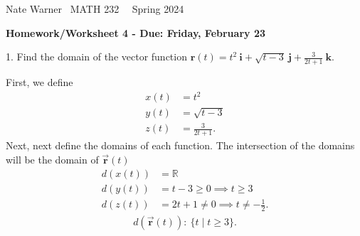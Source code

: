 \documentclass{report}
\title{\Huge{}}
\author{\huge{Nathan Warner}}
\date{\huge{}}
\begin{document}
    \pagebreak \bigbreak \noindent
    Nate Warner \ \quad \quad \quad \quad \quad \quad \quad \quad \quad \quad \quad \quad  MATH 232 \quad  \quad \quad \quad \quad \quad \quad \quad \quad \ \ \quad \quad Spring 2024
    \begin{center}
        \textbf{Homework/Worksheet 4 - Due: Friday, February 23}
    \end{center}
    \bigbreak \noindent 
    \begin{mdframed}
        1. Find the domain of the vector function $\mathbf{r}(t) = t^2\ \mathbf{i} + \sqrt{t - 3}\ \mathbf{j} + \frac{3}{2t+1}\ \mathbf{k}$.
    \end{mdframed}
    \bigbreak \noindent 
    First, we define
    \begin{align*}
        x(t) &= t^{2} \\
        y(t) &= \sqrt{t-3} \\
        z(t) &= \frac{3}{2t+1}
    .\end{align*}
    Next, next define the domains of each function. The intersection of the domains will be the domain of $\vec{\mathbf{r}}(t)$
    \begin{align*}
        d(x(t)) &=  \mathbb{R} \\
        d(y(t)) &= t-3 \geq 0 \implies t \geq 3 \\
        d(z(t)) &=2t+1 \neq 0 \implies t \neq -\frac{1}{2}
    .\end{align*}
    \begin{align*}
        d(\vec{\mathbf{r}}(t)):\ \{t \mid t \geq 3\}
    .\end{align*}
\end{document}
